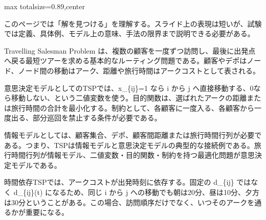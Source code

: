 \begin{minipage}[t]{0.58\textwidth}
\begin{adjustbox}{max totalsize={\textwidth}{0.89\textheight},center}
\begin{minipage}{\textwidth}\scriptsize
{}このページでは「解を見つける」を理解する。スライド上の表現は短いが、試験では定義、具体例、モデル上の意味、手法の限界まで説明できる必要がある。\par
Travelling Salesman Problem は、複数の顧客を一度ずつ訪問し、最後に出発点へ戻る最短ツアーを求める基本的なルーティング問題である。顧客やデポはノード、ノード間の移動はアーク、距離や旅行時間はアークコストとして表される。\par
意思決定モデルとしてのTSPでは、x\_\{ij\}=1 なら i から j へ直接移動する、0なら移動しない、という二値変数を使う。目的関数は、選ばれたアークの距離または旅行時間の合計を最小化する。制約として、各顧客に一度入る、各顧客から一度出る、部分巡回を禁止する条件が必要である。\par
情報モデルとしては、顧客集合、デポ、顧客間距離または旅行時間行列が必要である。つまり、TSPは情報モデルと意思決定モデルの典型的な接続例である。旅行時間行列が情報モデル、二値変数・目的関数・制約を持つ最適化問題が意思決定モデルである。\par
時間依存TSPでは、アークコストが出発時刻に依存する。固定の d\_\{ij\} ではなく d\_\{ij\}(t) になるため、同じ i から j への移動でも朝は20分、昼は10分、夕方は30分ということがある。この場合、訪問順序だけでなく、いつそのアークを通るかが重要になる。\par

\end{minipage}
\end{adjustbox}
\end{minipage}
